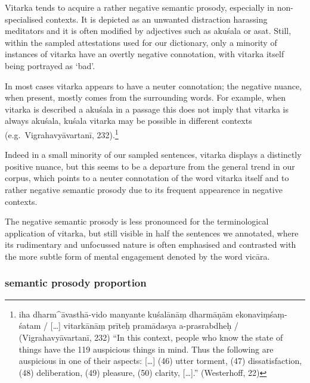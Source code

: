 \documentclass[
  letterpaper,
  DIV=11,
  numbers=noendperiod,
  oneside]{scrreprt}
\begin{document}
Vitarka tends to acquire a rather negative semantic prosody, especially
in non-specialised contexts. It is depicted as an unwanted distraction
harassing meditators and it is often modified by adjectives such as
akuśala or asat. Still, within the sampled attestations used for our
dictionary, only a minority of instances of vitarka have an overtly
negative connotation, with vitarka itself being portrayed as `bad'.

In most cases vitarka appears to have a neuter connotation; the negative
nuance, when present, mostly comes from the surrounding words. For
example, when vitarka is described a akuśala in a passage this does not
imply that vitarka is always akuśala, kuśala vitarka may be possible in
different contexts (e.g.~Vigrahavyāvartanī, 232).\footnote{iha
  dharm\^{}āvasthā-vido manyante kuśalānāṃ dharmāṇām ekonaviṃśaṃ-śatam /
  {[}\ldots{]} vitarkānāṃ prīteḥ pramādasya a-prasrabdheḥ /
  (Vigrahavyāvartanī, 232) ``In this context, people who know the state
  of things have the 119 auspicious things in mind. Thus the following
  are auspicious in one of their aspects: {[}\ldots{]} (46) utter
  torment, (47) dissatisfaction, (48) deliberation, (49) pleasure, (50)
  clarity, {[}\ldots{]}.'' (Westerhoff, 22)}

{}

Indeed in a small minority of our sampled sentences, vitarka displays a
distinctly positive nuance, but this seems to be a departure from the
general trend in our corpus, which points to a neuter connotation of the
word vitarka itself and to rather negative semantic prosody due to its
frequent appearence in negative contexts.

The negative semantic prosody is less pronounced for the terminological
application of vitarka, but still visible in half the sentences we
annotated, where its rudimentary and unfocussed nature is often
emphasised and contrasted with the more subtle form of mental engagement
denoted by the word vicāra.

\hypertarget{semantic-prosody-proportion-1}{%
\subsubsection{semantic prosody
proportion}\label{semantic-prosody-proportion-1}}
\end{document}
